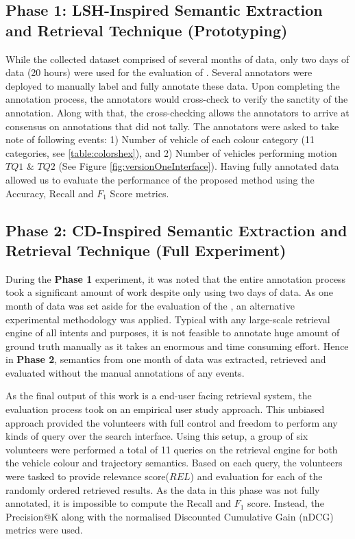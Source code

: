 \subsection{Phase 1: LSH-Inspired Semantic Extraction and Retrieval Technique (Prototyping)}
While the collected dataset comprised of several months of data, only two days of data (20 hours) were used for the evaluation of \versionOneRet. Several annotators were deployed to manually label and fully annotate these data. Upon completing the annotation process, the annotators would cross-check to verify the sanctity of the annotation.
Along with that, the cross-checking allows the annotators to arrive at consensus on annotations that did not tally. The annotators were asked to take note of following events:
1) Number of vehicle of each colour category (11 categories, see \ref{table:colorshex}), and 2) Number of vehicles performing motion $TQ1$ \& $TQ2$ (See Figure \ref{fig:versionOneInterface}).
Having fully annotated data allowed us to evaluate the performance of the proposed method using the Accuracy, Recall and $F_1$ Score metrics.

\subsection{Phase 2: CD-Inspired Semantic Extraction and Retrieval Technique (Full Experiment)}

During the \textbf{Phase 1} experiment, it was noted that the entire annotation process took a significant amount of work despite only using two days of data. As one month of data was set aside for the evaluation of the \versionTwoRet, an alternative experimental methodology was applied.
Typical with any large-scale retrieval engine of all intents and purposes, it is not feasible to annotate huge amount of ground truth manually as it takes an enormous and time consuming effort.
Hence in \textbf{Phase 2}, semantics from one month of data was extracted, retrieved and evaluated without the manual annotations of any events.

As the final output of this work is a end-user facing retrieval system, the evaluation process took on an empirical user study approach. This unbiased approach provided the volunteers with full control and freedom to perform any kinds of query over the search interface.
Using this setup, a group of six volunteers were performed a total of 11 queries on the retrieval engine for both the vehicle colour and trajectory semantics.
Based on each query, the volunteers were tasked to provide relevance score($REL$) and evaluation for each of the randomly ordered retrieved results.
As the data in this phase was not fully annotated, it is impossible to compute the Recall and $F_1$ score. Instead, the Precision@K along with the normalised Discounted Cumulative Gain (nDCG) metrics were used.

